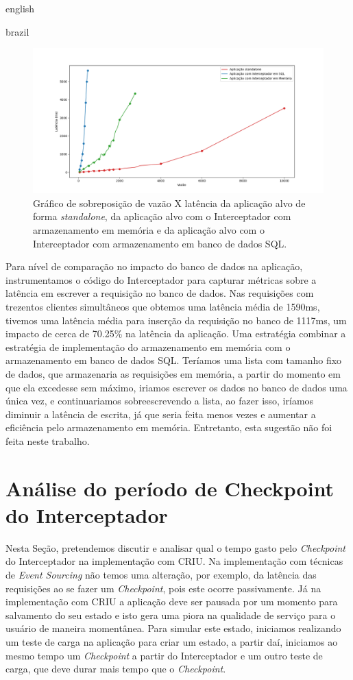 \begin{otherlanguage*}{english}
\begin{otherlanguage*}{brazil}
\begin{figure}[h]
\centering
\includegraphics[scale=0.46]{images/vazaoxlatencia.png}
\caption{Gráfico de sobreposição de vazão X latência da aplicação alvo de forma \textit{standalone}, da aplicação alvo com o Interceptador com armazenamento em memória e da aplicação alvo com o Interceptador com armazenamento em banco de dados SQL.}
\label{fig:analysis-interceptor-standalone}
\end{figure}

Para nível de comparação no impacto do banco de dados na aplicação, instrumentamos o
código do Interceptador para capturar métricas sobre a latência em escrever a requisição
no banco de dados. Nas requisições com trezentos clientes simultâneos que obtemos uma
latência média de 1590ms, tivemos uma latência média para inserção da requisição no banco
de 1117ms, um impacto de cerca de 70.25\% na latência da aplicação. Uma estratégia combinar
a estratégia de implementação do armazenamento em memória com o armazenamento em banco de
dados SQL. Teríamos uma lista com tamanho fixo de dados, que armazenaria as requisições em
memória, a partir do momento em que ela excedesse sem máximo, iriamos escrever os dados no
banco de dados uma única vez, e continuariamos sobreescrevendo a lista, ao fazer isso,
iríamos diminuir a latência de escrita, já que seria feita menos vezes e aumentar a
eficiência pelo armazenamento em memória. Entretanto, esta sugestão não foi feita neste
trabalho.

\section{Análise do período de Checkpoint do Interceptador}

Nesta Seção, pretendemos discutir e analisar qual o tempo gasto pelo \textit{Checkpoint} do
Interceptador na implementação com CRIU. Na implementação com técnicas de
\textit{Event Sourcing} não temos uma alteração, por exemplo, da latência das requisições ao
se fazer um \textit{Checkpoint}, pois este ocorre passivamente. Já na implementação com CRIU
a aplicação deve ser pausada por um momento para salvamento do seu estado e isto gera uma
piora na qualidade de serviço para o usuário de maneira momentânea. Para simular este estado,
iniciamos realizando um teste de carga na aplicação para criar um estado, a partir daí, iniciamos
ao mesmo tempo um \textit{Checkpoint} a partir do Interceptador e um outro teste de carga, que deve
durar mais tempo que o \textit{Checkpoint}.


\end{otherlanguage*}
\end{otherlanguage*}

